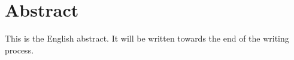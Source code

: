 \chapter*{Abstract}

This is the English abstract. It will be written towards the end of the writing
process.
